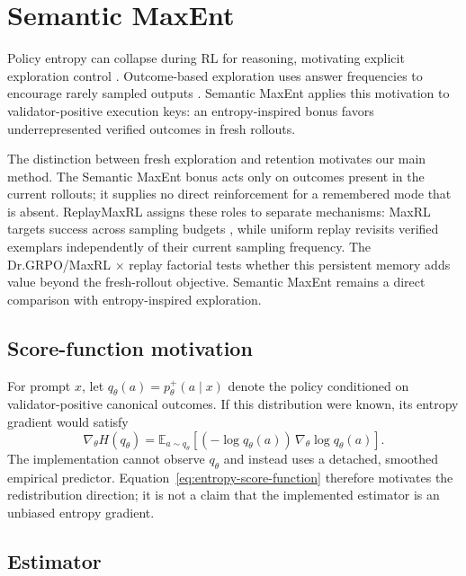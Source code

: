 \documentclass{article}
\newcommand{\1}{\mathbf 1}
\newcommand{\E}{\mathbb E}
\theoremstyle{remark}
\theoremstyle{definition}
\theoremstyle{plain}
\begin{document}
\section{Semantic MaxEnt}
\label{app:semantic-maxent}

Policy entropy can collapse during RL for reasoning, motivating explicit
exploration control \citep{cui2025entropy}. Outcome-based exploration uses
answer frequencies to encourage rarely sampled outputs
\citep{song2025outcome}. Semantic MaxEnt applies this motivation to
validator-positive execution keys: an entropy-inspired bonus favors
underrepresented verified outcomes in fresh rollouts.

The distinction between fresh exploration and retention motivates our main
method. The Semantic MaxEnt bonus acts only on outcomes present in the current
rollouts; it supplies no direct reinforcement for a remembered mode that is
absent. ReplayMaxRL assigns these roles to separate mechanisms: MaxRL targets
success across sampling budgets \citep{tajwar2026maxrl}, while uniform replay
revisits verified exemplars independently of their current sampling frequency.
The Dr.GRPO/MaxRL $\times$ replay factorial tests whether this persistent
memory adds value beyond the fresh-rollout objective. Semantic MaxEnt remains
a direct comparison with entropy-inspired exploration.

\subsection{Score-function motivation}
\label{app:semantic-score}

For prompt $x$, let $q_\theta(a)=p_\theta^+(a\mid x)$ denote the policy
conditioned on validator-positive canonical outcomes. If this distribution
were known, its entropy gradient would satisfy
\begin{equation}
  \nabla_\theta H(q_\theta)
  =\E_{a\sim q_\theta}\!\left[
    (-\log q_\theta(a))\,\nabla_\theta\log q_\theta(a)
  \right].
  \label{eq:entropy-score-function}
\end{equation}
The implementation cannot observe $q_\theta$ and instead uses a detached,
smoothed empirical predictor. Equation~\ref{eq:entropy-score-function}
therefore motivates the redistribution direction; it is not a claim that the
implemented estimator is an unbiased entropy gradient.

\subsection{Estimator}
\label{app:legacy-semantic-estimator}
\label{app:semantic-estimator}
\end{document}
